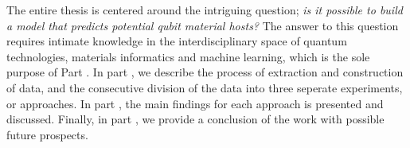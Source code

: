 The entire thesis is centered around the intriguing question; \textit{is it possible to build a model that predicts potential qubit material hosts?} The answer to this question requires intimate knowledge in the interdisciplinary space of quantum technologies, materials informatics and machine learning, which is the sole purpose of Part . In part , we describe the process of extraction and construction of data, and the consecutive division of the data into three seperate experiments, or approaches. In part , the main findings for each approach is presented and discussed. Finally, in part , we provide a conclusion of the work with possible future prospects.







